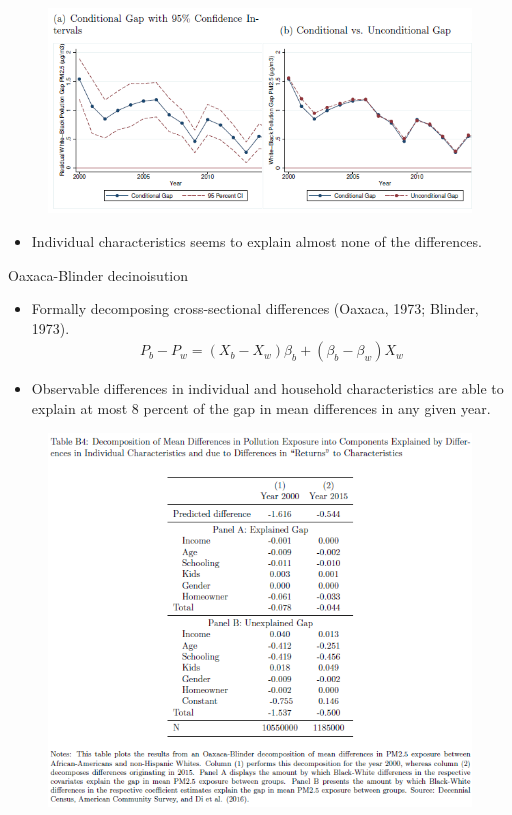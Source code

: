 \documentclass[dvipdfmx,12pt]{beamer}
\begin{document}
\begin{frame}{}
  \begin{figure}
    \centering
    \includegraphics[scale = 1]{F3AB.png}
  \end{figure}
  \begin{itemize}
    \item Individual characteristics seems to explain almost none of the differences.
  \end{itemize}
\end{frame}

\begin{frame}{Oaxaca-Blinder decinoisution}
  \begin{itemize}
    \item Formally decomposing cross-sectional differences (Oaxaca, 1973; Blinder, 1973).
    \begin{align*}
      P_b - P_w = (X_b - X_w)\beta_b + (\beta_b - \beta_w)X_w
    \end{align*}
    \item Observable differences in individual and household characteristics are able to explain at most 8 percent of the gap in mean differences in any given year.
  \end{itemize}
\end{frame}

\begin{frame}{}
  \begin{figure}
    \centering
    \includegraphics[scale = .6]{TB4.png}
  \end{figure}
\end{frame}
\end{document}
